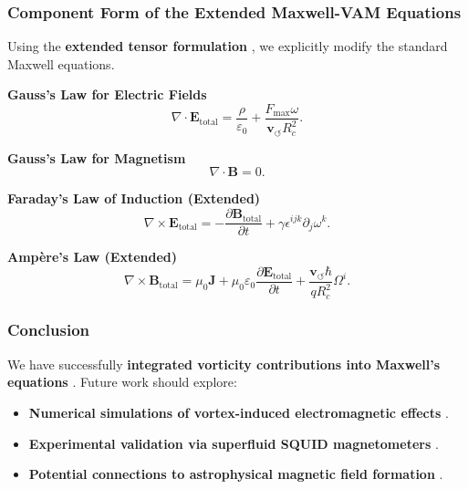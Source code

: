 \subsubsection*{Component Form of the Extended Maxwell-VAM Equations}
Using the \textbf{extended tensor formulation} , we explicitly modify the standard Maxwell equations.

\textbf{Gauss's Law for Electric Fields}
\begin{equation*}
    \nabla \cdot \mathbf{E}_\text{total} = \frac{\rho}{\varepsilon_0} + \frac{F_{\max} \omega}{\mathbf{v}_{\scriptscriptstyle\boldsymbol{\circlearrowleft}} R_c^2}.
\end{equation*}

\textbf{Gauss's Law for Magnetism}
\begin{equation*}
    \nabla \cdot \mathbf{B} = 0.
\end{equation*}

\textbf{Faraday's Law of Induction (Extended)}
\begin{equation*}
    \nabla \times \mathbf{E}_\text{total} = - \frac{\partial \mathbf{B}_\text{total}}{\partial t} + \gamma \epsilon^{ijk} \partial_j \omega^k.
\end{equation*}

\textbf{Ampère's Law (Extended)}
\begin{equation*}
    \nabla \times \mathbf{B}_\text{total} = \mu_0 \mathbf{J} + \mu_0 \varepsilon_0 \frac{\partial \mathbf{E}_\text{total}}{\partial t} + \frac{\mathbf{v}_{\scriptscriptstyle\boldsymbol{\circlearrowleft}} \hbar}{q R_c^2} \Omega^i.
\end{equation*}

\subsubsection*{Conclusion}
We have successfully \textbf{integrated vorticity contributions into Maxwell's equations} . Future work should explore:
\begin{itemize}
    \item \textbf{Numerical simulations of vortex-induced electromagnetic effects} .
    \item \textbf{Experimental validation via superfluid SQUID magnetometers} .
    \item \textbf{Potential connections to astrophysical magnetic field formation} .
\end{itemize}